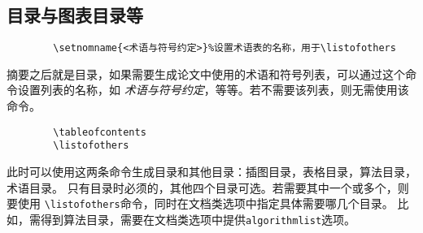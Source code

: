 \documentclass[figurelist,tablelist,algorithmlist,nomlist,masters]{seuthesix}
\begin{document}
	\subsection{目录与图表目录等}
	{\color{magenta}
		\begin{verbatim}
		\setnomname{<术语与符号约定>}%设置术语表的名称，用于\listofothers
		\end{verbatim}
	}
	摘要之后就是目录，如果需要生成论文中使用的术语和符号列表，可以通过这个命令设置列表的名称，如
	\textit{术语与符号约定}，等等。若不需要该列表，则无需使用该命令。

	{\color{magenta}
		\begin{verbatim}
		\tableofcontents
		\listofothers
		\end{verbatim}
	}
	此时可以使用这两条命令生成目录和其他目录：插图目录，表格目录，算法目录，术语目录。
	只有目录时必须的，其他四个目录可选。若需要其中一个或多个，则要使用
	\verb+\listofothers+命令，同时在文档类选项中指定具体需要哪几个目录。
	比如，需得到算法目录，需要在文档类选项中提供\texttt{algorithmlist}选项。
\end{document}
